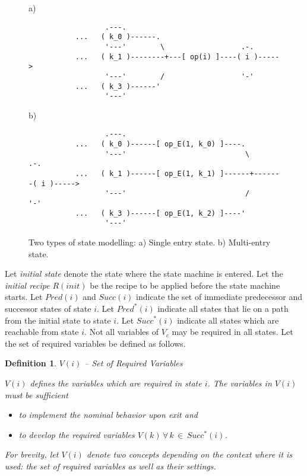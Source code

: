 \documentclass[12pt,a4paper]{scrartcl}
\newtheorem{definition}{Definition}
\begin{document}
\begin{figure}[htbp] \leavevmode \label{fig:se-vs-me}
a)

\begin{verbatim}
                  .---.  
           ...   ( k_0 )------.
                  '---'        \                  .-.
           ...   ( k_1 )--------+---[ op(i) ]----( i )----->   
                  '---'        /                  '-'
           ...   ( k_3 )------'       
                  '---'
\end{verbatim}
     
b)
     
\begin{verbatim}
                  .---.
           ...   ( k_0 )------[ op_E(1, k_0) ]----.
                  '---'                            \         .-.
           ...   ( k_1 )------[ op_E(1, k_1) ]------+-------( i )----->  
                  '---'                            /         '-'
           ...   ( k_3 )------[ op_E(1, k_2) ]----'       
                  '---'
\end{verbatim}
\caption{Two types of state modelling: a) Single entry state. 
b) Multi-entry state.}
\end{figure}

Let \textit{initial state} denote the state where the state machine is entered.
Let the \textit{initial recipe} $R(init)$ be the recipe to be applied before
the state machine starts.  Let $Pred(i)$ and $Succ(i)$ indicate the set of
immediate predecessor and successor states of state $i$. Let $Pred^*(i)$
indicate all states that lie on a path from the initial state to state $i$.
Let $Succ^*(i)$ indicate all states which are reachable from state $i$. Not all
variables of $V_c$ may be required in all states. Let the set of required
variables be defined as follows.

\begin{definition}
$V(i)$ -- Set of Required Variables

$V(i)$ defines the variables which are required in state $i$.
The variables in $V(i)$ must be sufficient

\begin{itemize}
\item to implement the nominal behavior upon exit and
\item to develop the required variables $V(k)\,\forall\,k\,\in\,Succ^*(i)$. 
\end{itemize}

For brevity, let $V(i)$ denote two concepts depending on the context where it
is used: the set of required variables as well as their settings.

\end{definition}
\end{document}
